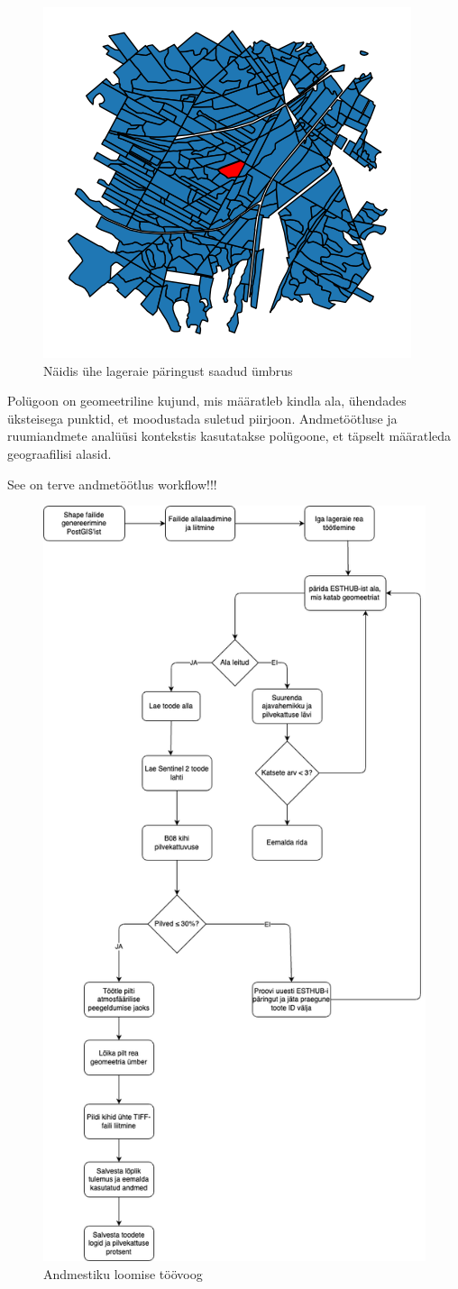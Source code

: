\begin{figure}[hb]
    \centering
    \includegraphics[width=.5\textwidth]{figures/andmestik/er_id_is10124223.png}
    \caption{Näidis ühe lageraie päringust saadud ümbrus}
    \label{fig:umbrusexample}
\end{figure}

Polügoon on geomeetriline kujund, mis määratleb kindla ala, ühendades üksteisega
punktid, et moodustada suletud piirjoon. Andmetöötluse ja ruumiandmete analüüsi
kontekstis kasutatakse polügoone, et täpselt määratleda geograafilisi alasid. \cite{WhatLocationPolygon}

See on terve andmetöötlus workflow!!!
\begin{figure}[H]
    \centering
    \includegraphics[width=.8\textwidth]{figures/andmestik/andmete_voog.drawio.png}
    \caption{Andmestiku loomise töövoog}
    \label{fig:terveflow}
\end{figure}
